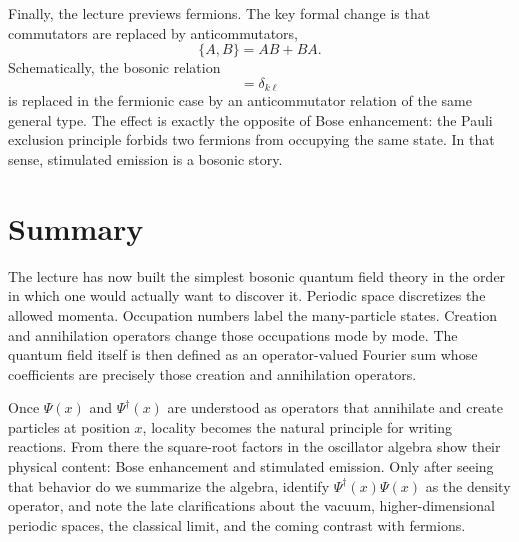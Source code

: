 Finally, the lecture previews fermions. The key formal change is that commutators are replaced by anticommutators,
\begin{equation}
\{A,B\}=AB+BA.
\end{equation}
Schematically, the bosonic relation
\begin{equation}
[a(k),a^\dagger(\ell)]=\delta_{k\ell}
\end{equation}
is replaced in the fermionic case by an anticommutator relation of the same general type. The effect is exactly the opposite of Bose enhancement: the Pauli exclusion principle forbids two fermions from occupying the same state. In that sense, stimulated emission is a bosonic story.

\section{Summary}

The lecture has now built the simplest bosonic quantum field theory in the order in which one would actually want to discover it. Periodic space discretizes the allowed momenta. Occupation numbers label the many-particle states. Creation and annihilation operators change those occupations mode by mode. The quantum field itself is then defined as an operator-valued Fourier sum whose coefficients are precisely those creation and annihilation operators.

Once \(\Psi(x)\) and \(\Psi^\dagger(x)\) are understood as operators that annihilate and create particles at position \(x\), locality becomes the natural principle for writing reactions. From there the square-root factors in the oscillator algebra show their physical content: Bose enhancement and stimulated emission. Only after seeing that behavior do we summarize the algebra, identify \(\Psi^\dagger(x)\Psi(x)\) as the density operator, and note the late clarifications about the vacuum, higher-dimensional periodic spaces, the classical limit, and the coming contrast with fermions.